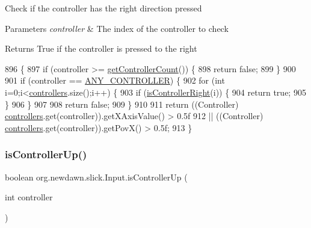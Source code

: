 Check if the controller has the right direction pressed


\begin{DoxyParams}{Parameters}
{\em controller} & The index of the controller to check \\
\hline
\end{DoxyParams}
\begin{DoxyReturn}{Returns}
True if the controller is pressed to the right 
\end{DoxyReturn}

\begin{DoxyCode}
896                                                      \{
897         \textcolor{keywordflow}{if} (controller >= \mbox{\hyperlink{classorg_1_1newdawn_1_1slick_1_1_input_a4a81c87f7d16d49471106d7fbaa0989d}{getControllerCount}}()) \{
898             \textcolor{keywordflow}{return} \textcolor{keyword}{false};
899         \}
900 
901         \textcolor{keywordflow}{if} (controller == \mbox{\hyperlink{classorg_1_1newdawn_1_1slick_1_1_input_a1f3df3cf41eaf8ae3bdf194d5cf96dd0}{ANY\_CONTROLLER}}) \{
902             \textcolor{keywordflow}{for} (\textcolor{keywordtype}{int} i=0;i<\mbox{\hyperlink{classorg_1_1newdawn_1_1slick_1_1_input_a1bcc91bf0db9efc578bd934a8ed9ce67}{controllers}}.size();i++) \{
903                 \textcolor{keywordflow}{if} (\mbox{\hyperlink{classorg_1_1newdawn_1_1slick_1_1_input_a216e74d174302d5f2656027f0983d53a}{isControllerRight}}(i)) \{
904                     \textcolor{keywordflow}{return} \textcolor{keyword}{true};
905                 \}
906             \}
907             
908             \textcolor{keywordflow}{return} \textcolor{keyword}{false};
909         \}
910         
911         \textcolor{keywordflow}{return} ((Controller) \mbox{\hyperlink{classorg_1_1newdawn_1_1slick_1_1_input_a1bcc91bf0db9efc578bd934a8ed9ce67}{controllers}}.get(controller)).getXAxisValue() > 0.5f
912                 || ((Controller) \mbox{\hyperlink{classorg_1_1newdawn_1_1slick_1_1_input_a1bcc91bf0db9efc578bd934a8ed9ce67}{controllers}}.get(controller)).getPovX() > 0.5f;
913     \}
\end{DoxyCode}
\mbox{\label{classorg_1_1newdawn_1_1slick_1_1_input_a222f2a8caf403540d14050698bfc4415}} 
\subsubsection{\texorpdfstring{is\+Controller\+Up()}{isControllerUp()}}
{\footnotesize\ttfamily boolean org.\+newdawn.\+slick.\+Input.\+is\+Controller\+Up (\begin{DoxyParamCaption}\item[{int}]{controller }\end{DoxyParamCaption})\hspace{0.3cm}{\ttfamily [inline]}}

